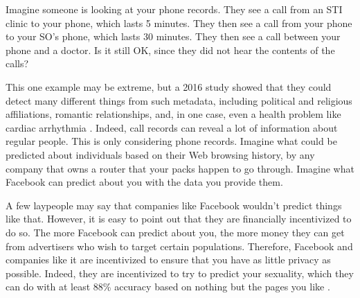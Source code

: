 Imagine someone is looking at your phone records. They see a call from an STI clinic to your phone, which lasts 5 minutes. They then see a call from your phone to your SO's phone, which lasts 30 minutes. They then see a call between your phone and a doctor. Is it still OK, since they did not hear the contents of the calls?

This one example may be extreme, but a 2016 study showed that they could detect many different things from such metadata, including political and religious affiliations, romantic relationships, and, in one case, even a health problem like cardiac arrhythmia \cite{phonemetadata}. Indeed, call records can reveal a lot of information about regular people. This is only considering phone records. Imagine what could be predicted about individuals based on their Web browsing history, by any company that owns a router that your packs happen to go through. Imagine what Facebook can predict about you with the data you provide them.

A few laypeople may say that companies like Facebook wouldn't predict things like that. However, it is easy to point out that they are financially incentivized to do so. The more Facebook can predict about you, the more money they can get from advertisers who wish to target certain populations. Therefore, Facebook and companies like it are incentivized to ensure that you have as little privacy as possible. Indeed, they are incentivized to try to predict your sexuality, which they can do with at least 88\% accuracy based on nothing but the pages you like \cite{facebookhomosexuality}.
